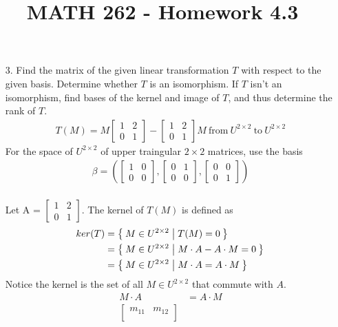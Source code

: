 \documentclass[letterpaper,12pt]{article}
\author{}
\title{MATH 262 - Homework 4.3}
\date{} %
\newcommand{\mat}[1]{
  \begin{bmatrix}
    #1
  \end{bmatrix}
}
\begin{document}
\maketitle

\begin{enumerate}
  \item[3.]
    Find the matrix of the given linear transformation $T$ with respect to the given basis. Determine whether $T$ is an isomorphism. If $T$ isn't an isomorphism, find bases of the kernel and image of $T$, and thus determine the rank of $T$.
    \begin{align*}
      T(M) = M\mat{1 & 2 \\ 0 & 1} - \mat{1 & 2 \\ 0 & 1}M \ \text{from} \ U^{2 \times 2} \ \text{to} \ U^{2 \times 2}
    \end{align*}
    For the space of $U^{2 \times 2}$ of upper traingular $2 \times 2$ matrices, use the basis
    \begin{align*}
      \beta = \left(
        \begin{bmatrix}
          1 & 0 \\
          0 & 0
        \end{bmatrix},
        \begin{bmatrix}
          0 & 1 \\
          0 & 0
        \end{bmatrix},
        \begin{bmatrix}
          0 & 0 \\
          0 & 1
        \end{bmatrix}
      \right)
    \end{align*} \\
    Let A = $\mat{1 & 2 \\ 0 & 1}$. The kernel of $T(M)$ is defined as
    \begin{align*}
      ker(T) &= \Set{M \in U^{2 \times 2} | T(M) = 0} \\
      &= \Set{
        M \in U^{2 \times 2}
        | M \cdot A - A \cdot M = 0
      } \\
      &= \Set{
        M \in U^{2 \times 2}
        | M \cdot A = A \cdot M
      }
    \end{align*}
    Notice the kernel is the set of all $M \in U^{2 \times 2}$ that commute with $A$.
    \begin{align*}
      M \cdot A &= A \cdot M \\
      \begin{bmatrix}
        m_{11} & m_{12} \\

\end{bmatrix}
\end{align*}
\end{enumerate}
\end{document}
